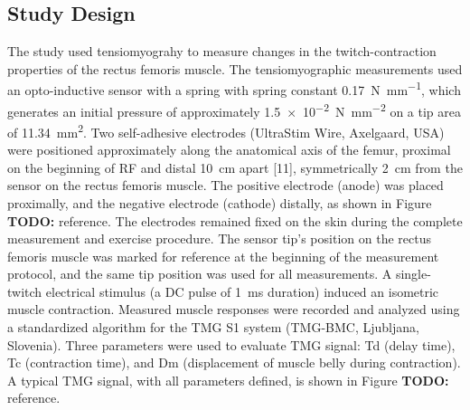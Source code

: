 \documentclass[utf8]{style/FrontiersinHarvard}
\newcommand{\TODO}[1]{{\textbf{TODO:} {\color{red} #1}}}
\begin{document}
\subsection{Study Design}
The study used tensiomyograhy to measure changes in the twitch-contraction properties of the rectus femoris muscle.
The tensiomyographic measurements used an opto-inductive sensor with a spring with spring constant \SI{0.17}{\newton \per \milli \meter}, which generates an initial pressure of approximately \SI{1.5e-2}{\newton \per \milli \meter \squared} on a tip area of \SI{11.34}{\milli \meter \squared}.
Two self-adhesive electrodes (UltraStim\textregistered{} Wire, Axelgaard, USA) were positioned approximately along the anatomical axis of the femur, proximal on the beginning of RF and distal \SI{10}{\centi \meter} apart [11], symmetrically \SI{2}{\centi \meter} from the sensor on the rectus femoris muscle.
The positive electrode (anode) was placed proximally, and the negative electrode (cathode) distally, as shown in Figure \TODO{reference}.
The electrodes remained fixed on the skin during the complete measurement and exercise procedure.
The sensor tip's position on the rectus femoris muscle was marked for reference at the beginning of the measurement protocol, and the same tip position was used for all measurements.
A single-twitch electrical stimulus (a DC pulse of \SI{1}{\milli \second} duration) induced an isometric muscle contraction.
Measured muscle responses were recorded and analyzed using a standardized algorithm for the TMG S1 system (TMG-BMC, Ljubljana, Slovenia).
Three parameters were used to evaluate TMG signal:
Td (delay time), Tc (contraction time), and Dm (displacement of muscle belly during contraction).
A typical TMG signal, with all parameters defined, is shown in Figure \TODO{reference}.
\end{document}
